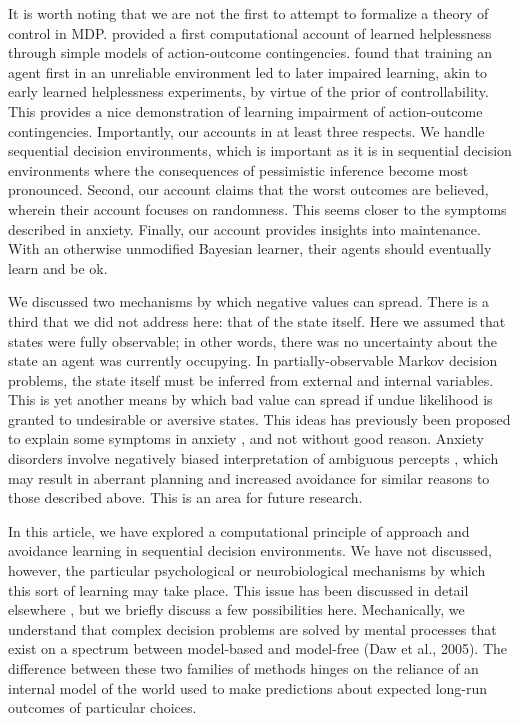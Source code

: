 \documentclass[11pt]{article} %
\begin{document}
It is worth noting that we are not the first to attempt to formalize a theory
of control in MDP. \cite{HuysDayan2009} provided a first computational account
of learned helplessness through simple models of action-outcome contingencies.
\cite{HuysDayan2009} found that training an agent first in an unreliable environment
led to later impaired learning, akin to early learned helplessness experiments,
by virtue of the prior of controllability. This provides a nice demonstration
of learning impairment of action-outcome contingencies. Importantly, our accounts
in at least three respects. We handle sequential decision environments, which is
important as it is in sequential decision environments where the consequences
of pessimistic inference become most pronounced. Second, our account claims
that the worst outcomes are believed, wherein their account focuses on randomness.
This seems closer to the symptoms described in anxiety. Finally, our account
provides insights into maintenance. With an otherwise unmodified Bayesian learner,
their agents should eventually learn and be ok.

We discussed two mechanisms by which negative values can spread. There is a third
that we did not address here: that of the state itself. Here we assumed that states
were fully observable; in other words, there was no uncertainty about the state
an agent was currently occupying. In partially-observable Markov decision problems,
the state itself must be inferred from external and internal variables. This is
yet another means by which bad value can spread if undue likelihood is granted
to undesirable or aversive states. This ideas has previously been proposed to
explain some symptoms in anxiety \citep{Paulus2012}, and not without good reason.
Anxiety disorders involve negatively biased interpretation of ambiguous percepts
\citep{Hartley2012}, which may result in aberrant planning and increased avoidance
for similar reasons to those described above. This is an area for future research.

In this article, we have explored a computational principle of approach and
avoidance learning in sequential decision environments. We have not discussed,
however, the particular psychological or neurobiological mechanisms by which this
sort of learning may take place. This issue has been discussed in detail elsewhere
\citep{Bishop2018}, but we briefly discuss a few possibilities here. Mechanically,
we understand that complex decision problems are solved by mental processes that
exist on a spectrum between model-based and model-free (Daw et al., 2005). The
difference between these two families of methods hinges on the reliance of an
internal model of the world used to make predictions about expected long-run
outcomes of particular choices.
\end{document}
